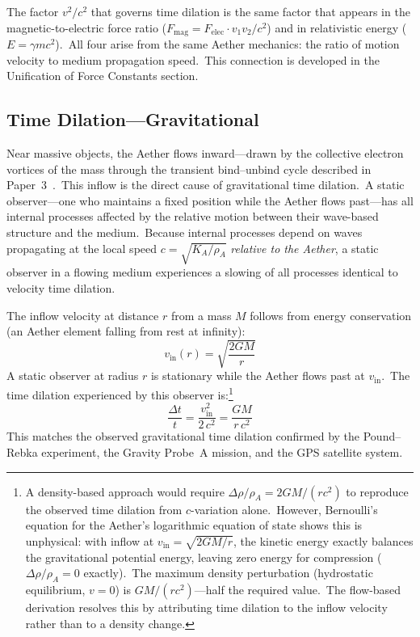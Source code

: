 ﻿\documentclass[12pt,letterpaper]{article}
\newcommand{\rhoa}{\rho_{\!A}}
\newcommand{\Ka}{K_{\!A}}
\newcommand{\vin}{v_{\mathrm{in}}}
\begin{document}
The factor $v^2/c^2$ that governs time dilation is the same factor that appears in the
magnetic-to-electric force ratio ($F_{\mathrm{mag}} = F_{\mathrm{elec}} \cdot v_1 v_2/c^2$) and in relativistic energy
($E = \gamma mc^2$).\ All four arise from the same Aether mechanics: the ratio of motion
velocity to medium propagation speed.\ This connection is developed in the Unification of
Force Constants section.


\subsection{Time Dilation---Gravitational}
\label{sec:grav-time-dilation}

Near massive objects, the Aether flows inward---drawn by the collective electron
vortices of the mass through the transient bind--unbind cycle described in
Paper~3~\cite{otto-gravity}.\ This inflow is the direct cause of gravitational time
dilation.\ A static observer---one who maintains a fixed position while the Aether
flows past---has all internal processes affected by the relative motion between
their wave-based structure and the medium.\ Because internal processes depend on
waves propagating at the local speed $c = \sqrt{\Ka/\rhoa}$ \emph{relative to the
Aether}, a static observer in a flowing medium experiences a slowing of all
processes identical to velocity time dilation.

The inflow velocity at distance $r$ from a mass $M$ follows from energy
conservation (an Aether element falling from rest at infinity):
%
\begin{equation}
  \vin(r) = \sqrt{\frac{2GM}{r}}
  \label{eq:inflow}
\end{equation}
%
A static observer at radius $r$ is stationary while the Aether flows past at
$\vin$.\ The time dilation experienced by this observer is:\footnote{A
density-based approach would require $\Delta\rho/\rhoa = 2GM/(rc^2)$ to
reproduce the observed time dilation from $c$-variation alone.\ However,
Bernoulli's equation for the Aether's logarithmic equation of state shows
this is unphysical: with inflow at $\vin = \sqrt{2GM/r}$, the kinetic energy
exactly balances the gravitational potential energy, leaving zero energy for
compression ($\Delta\rho/\rhoa = 0$ exactly).\ The maximum density perturbation
(hydrostatic equilibrium, $v = 0$) is $GM/(rc^2)$---half the required value.\
The flow-based derivation resolves this by attributing time dilation to the
inflow velocity rather than to a density change.}
%
\begin{equation}
  \frac{\Delta t}{t} = \frac{\vin^2}{2\,c^2} = \frac{GM}{r\,c^2}
\end{equation}
%
This matches the observed gravitational time dilation confirmed by the
Pound--Rebka experiment, the Gravity Probe~A mission, and the GPS satellite
system.
\end{document}
